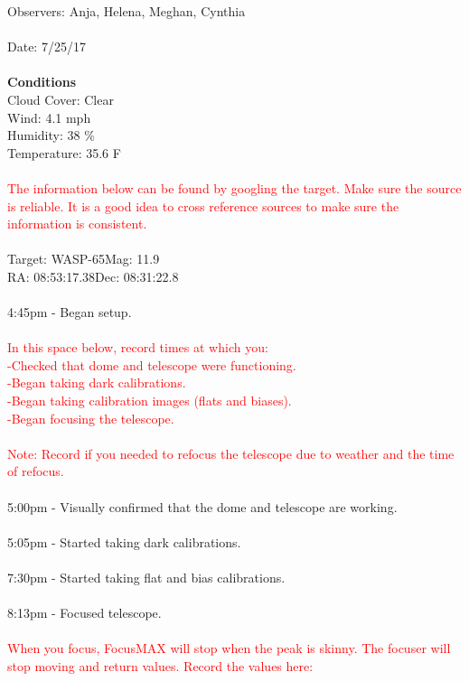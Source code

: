 \documentclass[11pt]{report}
\begin{document}
Observers: Anja, Helena, Meghan,  Cynthia \\ \\
Date: 7/25/17 \\ \\
{\bf Conditions \\}
Cloud Cover: Clear \\
Wind: 4.1 mph \\
Humidity: 38 \% \\
Temperature: 35.6 F \\ \\
\textcolor{red}{The information below can be found by googling the target. Make sure the source is reliable. It is a good idea to cross reference sources to make sure the information is consistent.} \\ \\
Target: WASP-65\hspace{75pt}Mag: 11.9 \\
RA: 08:53:17.38\hspace{85pt}Dec: 08:31:22.8 \\ \\
4:45pm - Began setup. \\ \\
\textcolor{red}{In this space below, record times at which you: \\
-Checked that dome and telescope were functioning. \\
-Began taking dark calibrations. \\
-Began taking calibration images (flats and biases). \\
-Began focusing the telescope. \\ \\
Note: Record if you needed to refocus the telescope due to weather and the time of refocus.} \\ \\
5:00pm - Visually confirmed that the dome and telescope are working. \\ \\
5:05pm - Started taking dark calibrations. \\ \\
7:30pm - Started taking flat and bias calibrations. \\ \\ 
8:13pm - Focused telescope. \\ \\
\textcolor{red}{When you focus, FocusMAX will stop when the peak is skinny. The focuser will stop moving and return values. Record the values here:} \\  \\
\end{document}
